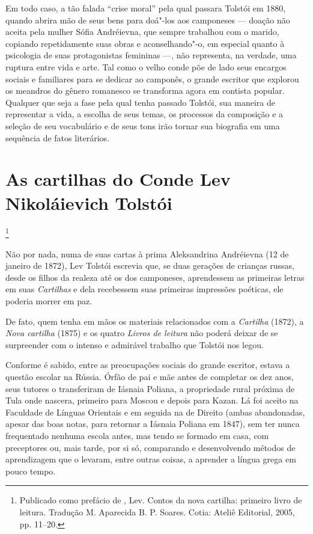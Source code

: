 Em todo caso, a tão falada ``crise moral'' pela qual passara
Tolstói em 1880, quando abrira mão de seus bens para doá"-los
aos camponeses --- doação não aceita pela mulher Sófia Andréievna,
que sempre trabalhou com o marido, copiando repetidamente suas
obras e aconselhando"-o, em especial quanto à psicologia de suas
protagonistas femininas ---, não representa, na verdade, uma
ruptura entre vida e arte. Tal como o velho conde põe de lado
seus encargos sociais e familiares para se dedicar ao camponês,
o grande escritor que explorou os meandros do gênero romanesco
se transforma agora em contista popular. Qualquer que seja a
fase pela qual tenha passado Tolstói, sua maneira de
representar a vida, a escolha de seus temas, os processos da
composição e a seleção de seu vocabulário e de seus tons irão
tornar sua biografia em uma sequência de fatos literários.

\chapter{As cartilhas do Conde Lev Nikoláievich Tolstói}\footnote{Publicado como prefácio de , Lev. {Contos da nova cartilha: primeiro livro de leitura}. Tradução M. Aparecida B. P. Soares. Cotia: Ateliê Editorial, 2005, pp. 11--20.}

Não por nada, numa de suas cartas à prima Aleksandrina Andréievna
(12 de janeiro de 1872), Lev Tolstói escrevia que, se
duas gerações de crianças russas, desde os filhos da realeza até
os dos camponeses, aprendessem as primeiras letras em suas
\emph{Cartilhas} e dela recebessem suas primeiras impressões
poéticas, ele poderia morrer em paz.

De fato, quem tenha em mãos os materiais relacionados com
a \emph{Cartilha} (1872), a \emph{Nova cartilha} (1875) e os
quatro \emph{Livros de leitura} não poderá deixar de se
surpreender com o intenso e admirável trabalho que Tolstói nos legou.

Conforme é sabido, entre as preocupações sociais do grande
escritor, estava a questão escolar na Rússia. Órfão de pai e
mãe antes de completar os dez anos, seus tutores o transferiram
de Iásnaia Poliana, a propriedade rural próxima de Tula onde
nascera, primeiro para Moscou e depois para Kazan. Lá foi
aceito na Faculdade de Línguas Orientais e em seguida na de
Direito (ambas abandonadas, apesar das boas notas, para retornar
a Iásnaia Poliana em 1847), sem ter nunca frequentado nenhuma
escola antes, mas tendo se formado em casa, com preceptores ou,
mais tarde, por si só, comparando e desenvolvendo métodos de
aprendizagem que o levaram, entre outras coisas, a aprender a
língua grega em pouco tempo. 

